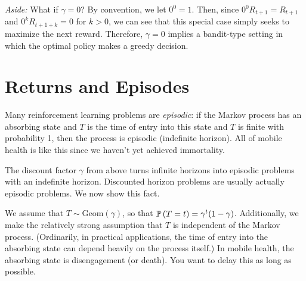\documentclass[11pt]{article}
\begin{document}
\textit{Aside:} What if $\gamma = 0$? By convention, we let $0^0 = 1$. Then, since $0^0 R_{t+1} = R_{t+1}$ and $0^k R_{t+1+k} = 0$ for $k > 0$, we can see that this special case simply seeks to maximize the next reward. Therefore, $\gamma = 0$ implies a bandit-type setting in which the optimal policy makes a greedy decision.

\section{Returns and Episodes}

Many reinforcement learning problems are \textit{episodic}: if the Markov process has an absorbing state and $T$ is the time of entry into this state and $T$ is finite with probability 1, then the process is episodic (indefinite horizon). All of mobile health is like this since we haven't yet achieved immortality. 

The discount factor $\gamma$ from above turns infinite horizons into episodic problems with an indefinite horizon. Discounted horizon problems are usually actually episodic problems. We now show this fact.

We assume that $T \sim \text{Geom}(\gamma)$, so that $\mathbb{P}\left( T=t \right)=\gamma^t(1 - \gamma)$. Additionally, we make the relatively strong assumption that $T$ is independent of the Markov process. (Ordinarily, in practical applications, the time of entry into the absorbing state can depend heavily on the process itself.) In mobile health, the absorbing state is disengagement (or death). You want to delay this as long as possible. 
\end{document}
